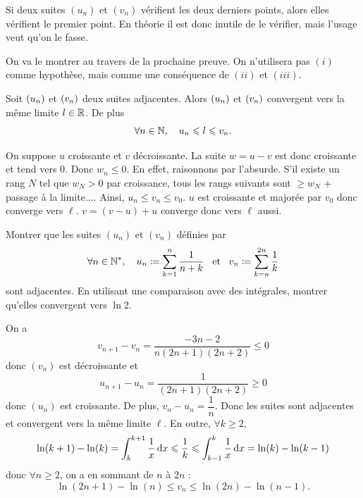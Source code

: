 \documentclass{magnoliaold}
\begin{document}
\begin{remarqueUnique}
\remarque Si deux suites $(u_n)$ et $(v_n)$ vérifient les deux derniers points,
  alors elles vérifient le premier point. En théorie il est donc inutile de
  le vérifier, mais l'usage veut qu'on le fasse.
\end{remarqueUnique}

\begin{sol}
On va le montrer au travers de la prochaine preuve. On n'utilisera pas $(i)$ comme hypothèse, mais comme une conséquence de $(ii)$ et $(iii)$.
\end{sol}

\begin{proposition}[utile=-3]
Soit $\left(u_n\right)$ et $\left(v_n\right)$ deux suites adjacentes. Alors $\left(u_n\right)$ et $\left(v_n\right)$
convergent vers la même limite $l\in\mathbb{R}$. De plus
\[\forall n\in\mathbb{N} ,\quad u_n \leqslant l \leqslant v_n.\]
\end{proposition}

\begin{preuve}
On suppose $u$ croissante et $v$ décroissante.
La suite $w=u-v$ est donc croissante et tend vers $0$. Donc $w_n\leq 0$. En effet, raisonnons par l'absurde. S'il existe un rang $N$ tel que $w_N>0$ par croissance, tous les rangs suivants sont $\geq w_N$ + passage à la limite.... Ainsi, $u_n\leq v_n\leq v_0$.
$u$ est croissante et majorée par $v_0$ donc converge vers $\ell$. $v=(v-u)+u$ converge donc vers $\ell$ aussi. 
\end{preuve}

\begin{exoUnique}
\exo Montrer que les suites $(u_n)$ et $(v_n)$ définies par
  \[\forall n\in{\mathbb{N}^*} ,\quad u_n\coloneqq\sum_{k=1}^n \frac{1}{n+k} \quad\!\text{et}\quad\!
    v_n\coloneqq\sum_{k=n}^{2n} \frac{1}{k}\]
  sont adjacentes. En utilisant une comparaison avec des intégrales, montrer
  qu'elles convergent vers $\ln 2$.
\end{exoUnique}

\begin{sol}
On a 
$$v_{n+1}-v_n=\frac{-3n-2}{n(2n+1)(2n+2)}\leq 0$$
donc $(v_n)$ est décroissante et $$u_{n+1}-u_n=\frac{1}{(2n+1)(2n+2)}\geq 0$$ donc $(u_n)$ est croissante. De plus, $v_n-u_n=\dfrac{1}{n}$.
Donc les suites sont adjacentes et convergent vers la même limite $\ell$.
En outre, $\forall k\geq 2$, $$\ln(k+1)-\ln(k)=\int_{k}^{k+1} \frac{1}{x}\,\text{d}x\leqslant \frac{1}{k} \leqslant \int_{k-1}^{k} \frac{1}{x}\,\text{d}x=\ln(k)-\ln(k-1)$$ donc $\forall n\geq 2$, on a en sommant de $n$ à $2n$ :
$$\ln(2n+1)-\ln(n)\leq v_n \leq \ln(2n)-\ln(n-1).$$
\end{sol}
\end{document}
